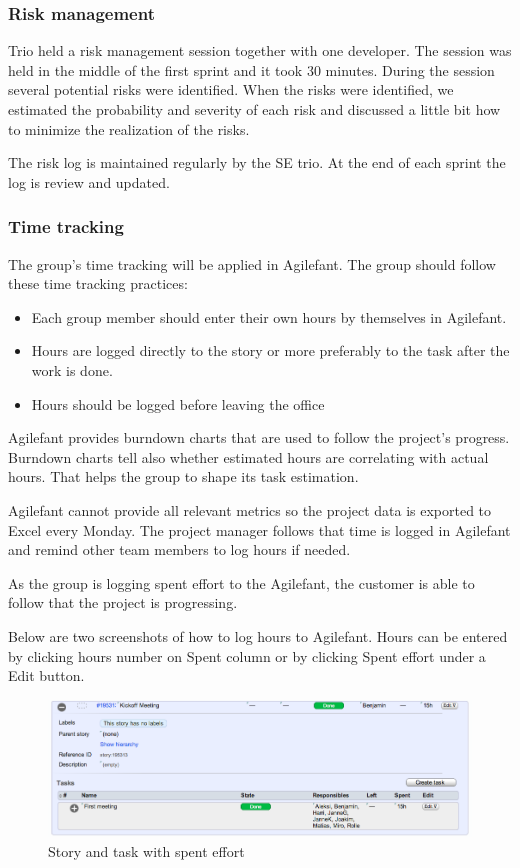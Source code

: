 \subsubsection{Risk management}

Trio held a risk management session together with one developer. The session was
held in the middle of the first sprint and it took 30 minutes. During the
session several potential risks were identified. When the risks were
identified, we estimated the probability and severity of each risk and discussed a little
bit how to minimize the realization of the risks.

The risk log is maintained regularly by the SE trio. At the end of each sprint
the log is review and updated.

\subsubsection{Time tracking}

The group's time tracking will be applied in Agilefant. The group should follow 
these time tracking practices:
\begin{itemize}
\item Each group member should enter their own hours by themselves in 
Agilefant.
\item Hours are logged directly to the story or more preferably to the task 
after the work is done. 
\item Hours should be logged before leaving the office
\end{itemize}

Agilefant provides burndown charts that are used to follow the project's
progress. Burndown charts tell also whether estimated hours are correlating with
actual hours. That helps the group to shape its task estimation.

Agilefant cannot provide all relevant metrics so the project data is exported to
Excel every Monday. The project manager follows that time is logged in
Agilefant and remind other team members to log hours if needed.

As the group is logging spent effort to the Agilefant, the customer is able to
follow that the project is progressing.

Below are two screenshots of how to log hours to Agilefant. Hours can be entered
by clicking hours number on Spent column or by clicking Spent effort under a
Edit button.

\begin{figure}[H]
\centering
\includegraphics[width=1\textwidth]{imgs/spenteffort1.png}
\caption{Story and task with spent effort}
\label{fig:spenteffort1}
\end{figure}


